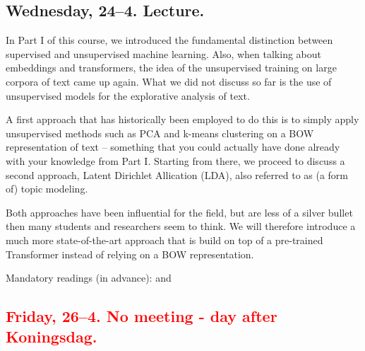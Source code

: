 \subsection*{Wednesday, 24--4. Lecture.}


In Part I of this course, we introduced the fundamental distinction between supervised and unsupervised machine learning. Also, when talking about embeddings and transformers, the idea of the unsupervised training on large corpora of text came up again. What we did not discuss so far is the use of unsupervised models for the explorative analysis of text.

A first approach that has historically been employed to do this is to simply apply unsupervised methods such as PCA and k-means clustering on a BOW representation of text -- something that you could actually have done already with your knowledge from Part I. Starting from there, we proceed to discuss a second approach, Latent Dirichlet Allication (LDA), also referred to as (a form of) topic modeling.

Both approaches have been influential for the field, but are less of a silver bullet then many students and researchers seem to think. We will therefore introduce a much more state-of-the-art approach that is build on top of a pre-trained Transformer instead of relying on a BOW representation.


Mandatory readings (in advance): \cite{Maier2018a} and  \cite{Grootendorst2022}







\subsection*{\textcolor{red}{Friday, 26--4. No meeting - day after Koningsdag.}}











